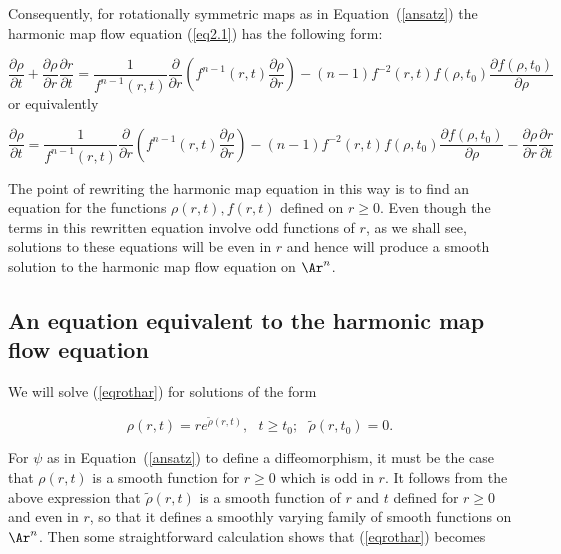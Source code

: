 Consequently,   for rotationally symmetric maps as in
Equation~(\ref{ansatz}) the harmonic map flow equation (\ref{eq2.1})
has the following form:

\begin{equation*}
 \frac{\partial \rho}{\partial t}+\frac{\partial \rho}{\partial r}\frac{\partial r}{\partial t}
 = \frac{1}{f^{n-1}(r,t)}
\frac{\partial }{\partial r} \left(  f^{n-1}(r,t) \frac{\partial
\rho}{\partial r} \right)-(n-1)f^{-2}(r,t) f(\rho,t_0)
\frac{\partial f(\rho,t_0)}{\partial \rho}
\end{equation*}
or equivalently

\begin{equation}\label{eqrothar}
\frac{\partial \rho}{\partial t}=\frac{1}{f^{n-1}(r,t)}
\frac{\partial }{\partial r} \left(  f^{n-1}(r,t) \frac{\partial
\rho}{\partial r} \right)-(n-1)f^{-2}(r,t) f(\rho,t_0)
\frac{\partial f(\rho,t_0)}{\partial \rho} -\frac{\partial
\rho}{\partial r}\frac{\partial r}{\partial t}
\end{equation}


The point of  rewriting the harmonic map equation in this way is to
find an equation for the functions $\rho(r,t), f(r,t)$ defined on
$r\ge 0$. Even though the terms in this rewritten equation involve
odd functions of $r$, as we shall see, solutions to these equations
will be even in $r$ and hence will produce a smooth solution to the
harmonic map flow equation on $\Ar ^n$.

\subsection{An equation equivalent to the harmonic map flow
equation}

We will solve (\ref{eqrothar})  for solutions of the form

\[ \rho(r,t)= re^{\tilde{\rho}(r,t)}, \ \ \ t\ge t_0;\ \ \ \tilde \rho(r,t_0)=0.
\]

For $\psi$ as in Equation~(\ref{ansatz}) to define a diffeomorphism,
it must be the case that $\rho(r,t)$ is a smooth function for $r\ge
0$ which is odd in $r$. It follows from the above expression that
$\tilde\rho(r,t)$ is a smooth function of $r$ and $t$ defined for
$r\ge 0$ and even in $r$, so that it defines a smoothly varying
family of smooth functions on $\Ar^n$. Then some straightforward
calculation shows that (\ref{eqrothar}) becomes

